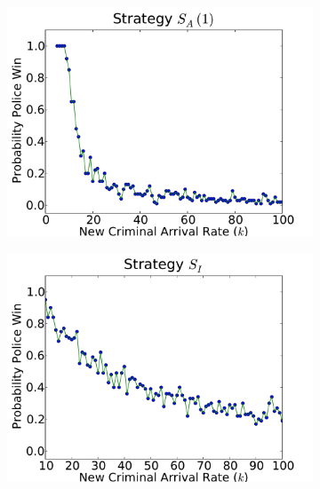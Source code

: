 \documentclass[11pt]{article}
\theoremstyle{plain}
\theoremstyle{definition}
\begin{document}
 \begin{figure}\centering
 \begin{subfigure}[b]{0.3\textwidth}
  \includegraphics[width=\textwidth]{ImprovedPlotS0.pdf}
  \caption{}
  \end{subfigure}
   \begin{subfigure}[b]{0.3\textwidth}
\includegraphics[width=\textwidth]{ImprovedPlotS1.pdf}
\caption{}
  \end{subfigure}
 \begin{subfigure}[b]{0.3\textwidth}

\end{subfigure}
\end{figure}
\end{document}
